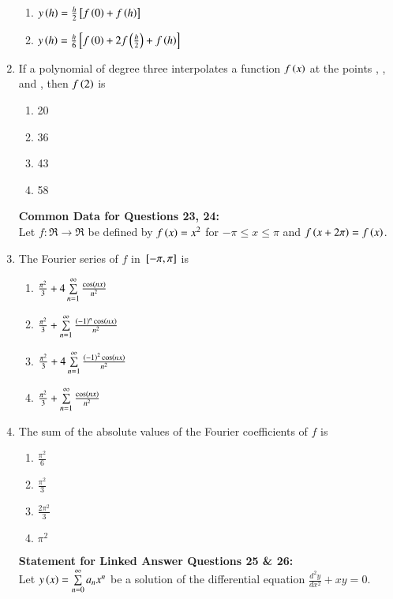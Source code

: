 \documentclass[journal]{IEEEtran}
\begin{document}
\begin{enumerate}
\begin{enumerate}
     \item $y\left(h\right) = \frac{h}{2}{}\left[f\left(0\right) + f\left(h\right)\right]$
     \item $y\left(h\right) = \frac{h}{6}{}\left[f\left(0\right) + 2f\left(\frac{h}{2}\right) + f\left(h\right)\right]$ \\
 \end{enumerate}
\item If a polynomial of degree three interpolates a function $f\left(x\right)$ at the points , ,  and , then $f\left(2\right)$ is
\begin{enumerate}
    \item 20
    \item 36
    \item 43
    \item 58 \\
\end{enumerate}
\textbf{Common Data for Questions 23, 24:} \\
Let $f : \mathfrak{R} \rightarrow \mathfrak{R}$ be defined by $f\left(x\right) = x^2$ for $-\pi \leq x \leq \pi$ and $f\left(x + 2\pi\right) = f\left(x\right)$. \\
\item The Fourier series of $f$ in ${}\left[-\pi, \pi\right]$ is
\begin{enumerate}
    \item $\frac{\pi^2}{3} + 4\sum\limits_{n=1}^{\infty}\frac{\cos\left(nx\right)}{n^2}$
    \item $\frac{\pi^2}{3} + \sum\limits_{n=1}^{\infty}\frac{\left(-1\right)^n\cos\left(nx\right)}{n^2}$
    \item $\frac{\pi^2}{3} + 4\sum\limits_{n=1}^{\infty}\frac{\left(-1\right)^2\cos\left(nx\right)}{n^2}$
    \item $\frac{\pi^2}{3} + \sum\limits_{n=1}^{\infty}\frac{\cos\left(nx\right)}{n^2}$ \\
\end{enumerate}
\item The sum of the absolute values of the Fourier coefficients of $f$ is
\begin{enumerate}
    \item $\frac{\pi^2}{6}$
    \item $\frac{\pi^2}{3}$
    \item $\frac{2\pi^2}{3}$
    \item $\pi^2$ \\
\end{enumerate}
\textbf{Statement for Linked Answer Questions 25 \& 26:} \\
Let $y\left(x\right) = \sum\limits_{n=0}^{\infty}a_nx^n$ be a solution of the differential equation $\frac{d^2y}{dx^2} + xy = 0$.\\

\end{enumerate}
\end{document}

